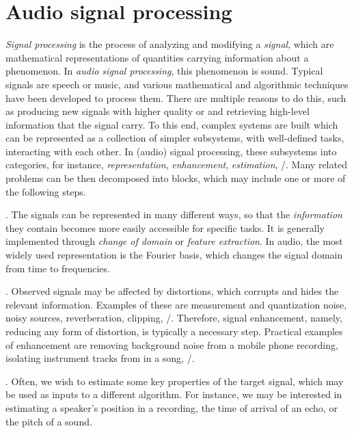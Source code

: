 \section{Audio signal processing}\label{sec:intro:processing}
\textit{Signal processing} is the process of analyzing and modifying a \textit{signal}, which are mathematical representations of quantities carrying information about a phenomenon.
In \textit{audio signal processing}, this phenomenon is sound.
Typical signals are speech or music, and various mathematical and algorithmic techniques have been developed to process them.
There are multiple reasons to do this, such as producing new signals with higher quality or and retrieving high-level information that the signal carry.
To this end, complex systems are built which can be represented as a collection of simpler subsystems, with well-defined tasks, interacting with each other.
In (audio) signal processing, these subsystems into categories, for instance, \textit{representation}, \textit{enhancement}, \textit{estimation}, \etc/.
Many related problems can be then decomposed into blocks, which may include one or more of the following steps.

.
    The signals can be represented in many different ways, so that the \textit{information} they contain becomes more easily accessible for specific tasks.
    It is generally implemented through \textit{change of domain} or \textit{feature extraction}.
    In audio, the most widely used representation is the Fourier basis, which changes the signal domain from time to frequencies.

.
    Observed signals may be affected by distortions, which corrupts and hides the relevant information.
    Examples of these are measurement and quantization noise, noisy sources, reverberation, clipping, \etc/.
    Therefore, signal enhancement, namely, reducing any form of distortion, is typically a necessary step.
    Practical examples of enhancement are removing background noise from a mobile phone recording, isolating instrument tracks from in a song, \etc/.

.
    Often, we wish to estimate some key properties of the target signal, which may be used as inputs to a different algorithm.
    For instance, we may be interested in estimating a speaker's position in a recording, the time of arrival of an echo, or the pitch of a sound.

